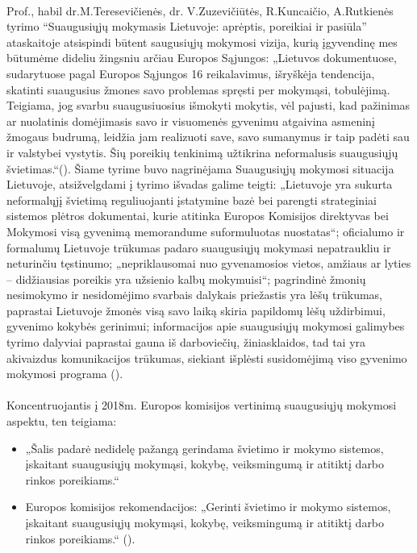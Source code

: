 \documentclass[12pt,a4paper, titlepage]{article}
\begin{document}
\paragraph{}	
	 Prof., habil dr.M.Teresevičienės,  dr. V.Zuzevičiūtės, R.Kuncaičio, A.Rutkienės tyrimo “Suaugusiųjų mokymasis Lietuvoje: aprėptis, poreikiai ir pasiūla” ataskaitoje atsispindi būtent saugusiųjų mokymosi vizija, kurią įgyvendinę mes būtumėme dideliu žingsniu arčiau Europos Sąjungos: „Lietuvos dokumentuose, sudarytuose pagal Europos Sąjungos 16 reikalavimus, išryškėja tendencija, skatinti suaugusius žmones savo problemas spręsti per mokymąsi, tobulėjimą. Teigiama, jog svarbu suaugusiuosius išmokyti mokytis, vėl pajusti, kad pažinimas ar nuolatinis domėjimasis savo ir visuomenės gyvenimu atgaivina asmeninį žmogaus budrumą, leidžia jam realizuoti save, savo sumanymus ir taip padėti sau ir valstybei vystytis. Šių poreikių tenkinimą užtikrina neformalusis suaugusiųjų švietimas.“(\cite{teresevivciene2006tyrimo}). Šiame tyrime buvo nagrinėjama Suaugusiųjų mokymosi situacija Lietuvoje, atsižvelgdami į tyrimo išvadas galime teigti: „Lietuvoje yra sukurta neformalųjį švietimą reguliuojanti įstatymine bazė bei parengti strateginiai sistemos plėtros dokumentai, kurie atitinka Europos Komisijos direktyvas bei Mokymosi visą gyvenimą memorandume suformuluotas nuostatas“; oficialumo ir formalumų Lietuvoje trūkumas  padaro suaugusiųjų mokymasi nepatraukliu ir neturinčiu tęstinumo; „nepriklausomai nuo gyvenamosios vietos, amžiaus ar lyties – didžiausias poreikis yra užsienio kalbų mokymuisi“; pagrindinė žmonių nesimokymo ir nesidomėjimo svarbais dalykais priežastis yra lėšų trūkumas, paprastai Lietuvoje žmonės visą savo laiką skiria papildomų lėšų uždirbimui, gyvenimo kokybės gerinimui; informacijos apie suaugusiųjų mokymosi galimybes tyrimo dalyviai paprastai gauna iš darboviečių, žiniasklaidos, tad tai yra akivaizdus komunikacijos trūkumas, siekiant išplėsti susidomėjimą viso gyvenimo mokymosi programa (\cite{teresevivciene2006tyrimo}).
\paragraph{}	 
	  Koncentruojantis  į 2018m. Europos komisijos vertinimą suaugusiųjų mokymosi aspektu, ten teigiama:
\begin{itemize}
\item „Šalis padarė nedidelę pažangą gerindama švietimo ir mokymo sistemos, įskaitant suaugusiųjų mokymąsi, kokybę, veiksmingumą ir atitiktį darbo rinkos poreikiams.“
\item Europos komisijos rekomendacijos: „Gerinti švietimo ir mokymo sistemos, įskaitant suaugusiųjų mokymąsi, kokybę, veiksmingumą ir atitiktį darbo rinkos poreikiams.“ (\cite{Rekomendacija2018}).
\end{itemize}
\end{document}

